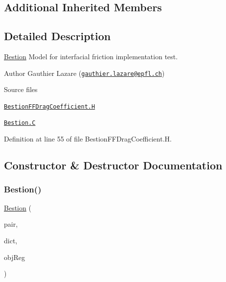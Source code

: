 \subsection*{Additional Inherited Members}


\subsection{Detailed Description}
\hyperlink{classFoam_1_1FFDragCoefficientModels_1_1Bestion}{Bestion} Model for interfacial friction implementation test. 

\label{_Description}%
 Author Gauthier Lazare (\href{mailto:gauthier.lazare@epfl.ch}{\tt gauthier.\+lazare@epfl.\+ch})

\begin{DoxyParagraph}{Source files}

\begin{DoxyItemize}
\item \href{../../../home/carlo/data/GeN-Foam/GeN-Foam_ffn/GeN-Foam/GeN-Foam/classes/thermalHydraulics/src/physicsModels/dragModels/FFDragCoefficientModels/Bestion/BestionFFDragCoefficient.H}{\tt Bestion\+F\+F\+Drag\+Coefficient.\+H} 
\item \href{../../../home/carlo/data/GeN-Foam/GeN-Foam_ffn/GeN-Foam/GeN-Foam/classes/thermalHydraulics/src/physicsModels/dragModels/FFDragCoefficientModels/Bestion/Bestion.C}{\tt Bestion.\+C} 
\end{DoxyItemize}
\end{DoxyParagraph}


Definition at line 55 of file Bestion\+F\+F\+Drag\+Coefficient.\+H.



\subsection{Constructor \& Destructor Documentation}
\mbox{\label{classFoam_1_1FFDragCoefficientModels_1_1Bestion_a36c525129c853863093780b39bf84f1b}} 
\subsubsection{\texorpdfstring{Bestion()}{Bestion()}}
{\footnotesize\ttfamily \hyperlink{classFoam_1_1FFDragCoefficientModels_1_1Bestion}{Bestion} (\begin{DoxyParamCaption}\item[{const \hyperlink{classFoam_1_1FFPair}{F\+F\+Pair} \&}]{pair,  }\item[{const dictionary \&}]{dict,  }\item[{const object\+Registry \&}]{obj\+Reg }\end{DoxyParamCaption})}



